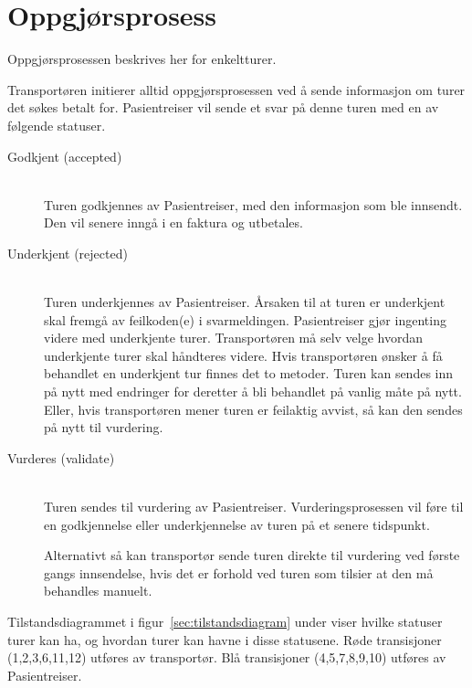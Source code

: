 \documentclass[a4paper,titlepage,norsk,11pt]{article}
\begin{document}
\section{Oppgjørsprosess}
\label{sec:Oppgjorsprosess}

Oppgjørsprosessen beskrives her for enkeltturer.

Transportøren initierer alltid oppgjørsprosessen ved å sende informasjon om turer det søkes betalt for. Pasientreiser vil sende et svar på denne turen med en av følgende statuser.

\begin{description}

	\item[Godkjent (accepted)] \hfill \\
	Turen godkjennes av Pasientreiser, med den informasjon som ble innsendt. Den vil senere inngå i en faktura og utbetales.

	\item[Underkjent (rejected)] \hfill \\
	Turen underkjennes av Pasientreiser. Årsaken til at turen er underkjent skal fremgå av feilkoden(e) i svarmeldingen. Pasientreiser gjør ingenting videre med underkjente turer. Transportøren må selv velge hvordan underkjente turer skal håndteres videre. Hvis transportøren ønsker å få behandlet en underkjent tur finnes det to metoder. Turen kan sendes inn på nytt med endringer for deretter å bli behandlet på vanlig måte på nytt. Eller, hvis transportøren mener turen er feilaktig avvist, så kan den sendes på nytt til vurdering.

	\item[Vurderes (validate)] \hfill \\
	Turen sendes til vurdering av Pasientreiser.  Vurderingsprosessen vil føre til en godkjennelse eller underkjennelse av turen på et senere tidspunkt.

	Alternativt så kan transportør sende turen direkte til vurdering ved første gangs innsendelse, hvis det er forhold ved turen som tilsier at den må behandles manuelt.

\end{description}

Tilstandsdiagrammet i figur~\ref{sec:tilstandsdiagram} under viser hvilke statuser turer kan ha, og hvordan turer kan havne i disse statusene. Røde transisjoner (1,2,3,6,11,12) utføres av transportør. Blå transisjoner (4,5,7,8,9,10) utføres av Pasientreiser.
\end{document}
